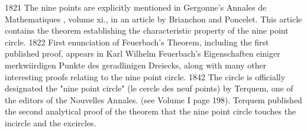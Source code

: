 1821
The nine points are explicitly mentioned in Gergonne's Annales de Mathematiques , volume xi., in an article by Brianchon and Poncelet. This article contains the theorem establishing the characteristic property of the nine point circle.
1822
First enunciation of Feuerbach's Theorem, including the first published proof, appears in Karl Wilhelm Feuerbach's Eigenschaften einiger merkwiirdigen Punkte des geradlinigen Dreiecks, along with many other interesting proofs relating to the nine point circle.
1842
The circle is officially designated the "nine point circle" (le cercle des neuf points) by Terquem, one of the editors of the Nouvelles Annales. (see Volume I page 198). Terquem published the second analytical proof of the theorem that the nine point circle touches the incircle and the excircles.

